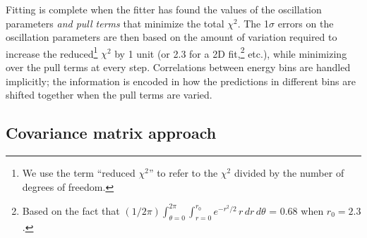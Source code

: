 \documentclass[../thesis.tex]{subfiles}
\begin{document}
Fitting is complete when the fitter has found the values of the oscillation parameters \emph{and pull terms} that minimize the total $\chi^2$. The 1$\sigma$ errors on the oscillation parameters are then based on the amount of variation required to increase the reduced\footnote{We use the term ``reduced $\chi^2$'' to refer to the $\chi^2$ divided by the number of degrees of freedom.} $\chi^2$ by 1 unit (or 2.3 for a 2D fit,\footnote{Based on the fact that $(1/2\pi)\int_{\theta=0}^{2\pi} \int_{r=0}^{r_0} e^{-r^2/2}\, r\,dr\,d\theta$ = 0.68 when $r_0 = 2.3$.} etc.), while minimizing over the pull terms at every step. Correlations between energy bins are handled implicitly; the information is encoded in how the predictions in different bins are shifted together when the pull terms are varied.

\begin{comment}
  See doc-8774 p29 and its ref 22 regarding the amount of chi2 increase for a 2D fit.
\end{comment}

\subsection{Covariance matrix approach}
\label{sec:covmatapproach}
\end{document}
